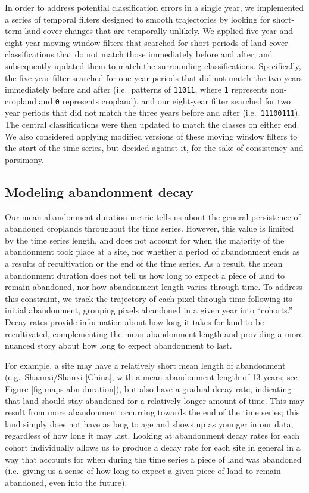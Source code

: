 \documentclass[9pt,twocolumn,twoside,lineno]{pnas-new}
\begin{document}
In order to address potential classification errors in a single year, we implemented a series of temporal filters designed to smooth trajectories by looking for short-term land-cover changes that are temporally unlikely.
We applied five-year and eight-year moving-window filters that searched for short periods of land cover classifications that do not match those immediately before and after, and subsequently updated them to match the surrounding classifications.
Specifically, the five-year filter searched for one year periods that did not match the two years immediately before and after (i.e.~patterns of \texttt{11011}, where \texttt{1} represents non-cropland and \texttt{0} represents cropland), and our eight-year filter searched for two year periods that did not match the three years before and after (i.e.~\texttt{11100111}).
The central classifications were then updated to match the classes on either end.
We also considered applying modified versions of these moving window filters to the start of the time series, but decided against it, for the sake of consistency and parsimony.

\hypertarget{decay-models-si}{%
\subsection{Modeling abandonment decay}\label{decay-models-si}}

Our mean abandonment duration metric tells us about the general persistence of abandoned croplands throughout the time series.
However, this value is limited by the time series length, and does not account for when the majority of the abandonment took place at a site, nor whether a period of abandonment ends as a results of recultivation or the end of the time series.
As a result, the mean abandonment duration does not tell us how long to expect a piece of land to remain abandoned, nor how abandonment length varies through time.
To address this constraint, we track the trajectory of each pixel through time following its initial abandonment, grouping pixels abandoned in a given year into ``cohorts.''
Decay rates provide information about how long it takes for land to be recultivated, complementing the mean abandonment length and providing a more nuanced story about how long to expect abandonment to last.

For example, a site may have a relatively short mean length of abandonment (e.g.~Shaanxi/Shanxi {[}China{]}, with a mean abandonment length of 13 years; see Figure \ref{fig:maps-abn-duration}), but also have a gradual decay rate, indicating that land should stay abandoned for a relatively longer amount of time.
This may result from more abandonment occurring towards the end of the time series; this land simply does not have as long to age and shows up as younger in our data, regardless of how long it may last.
Looking at abandonment decay rates for each cohort individually allows us to produce a decay rate for each site in general in a way that accounts for when during the time series a piece of land was abandoned (i.e.~giving us a sense of how long to expect a given piece of land to remain abandoned, even into the future).
\end{document}

